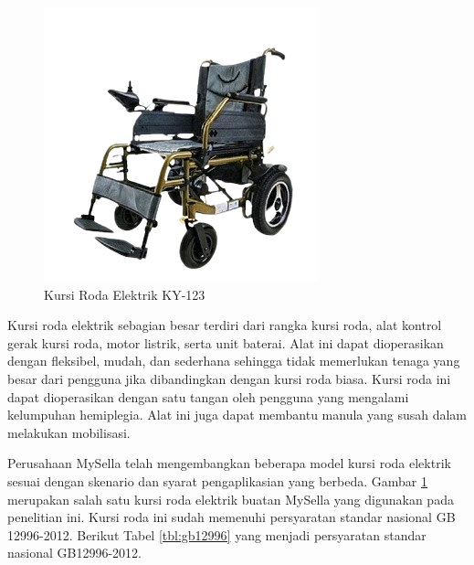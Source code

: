 \begin{figure} [ht]
    \centering
        \includegraphics[scale=0.72]{gambar/WheelchairMySellaKY123.png}
        \caption{Kursi Roda Elektrik KY-123}
        \label{fig:KY123}
\end{figure}

Kursi roda elektrik sebagian besar terdiri dari rangka kursi roda, alat kontrol gerak kursi roda, motor listrik, serta unit baterai. Alat ini dapat dioperasikan dengan fleksibel, mudah, dan sederhana sehingga tidak memerlukan tenaga yang besar dari pengguna jika dibandingkan dengan kursi roda biasa. Kursi roda ini dapat dioperasikan dengan satu tangan oleh pengguna yang mengalami kelumpuhan hemiplegia. Alat ini juga dapat membantu manula yang susah dalam melakukan mobilisasi. 

Perusahaan MySella telah mengembangkan beberapa model kursi roda elektrik sesuai dengan skenario dan syarat pengaplikasian yang berbeda. Gambar \ref{fig:KY123} merupakan salah satu kursi roda elektrik buatan MySella yang digunakan pada penelitian ini. Kursi roda ini sudah memenuhi persyaratan standar nasional GB 12996-2012. Berikut Tabel \ref{tbl:gb12996} yang menjadi persyaratan standar nasional GB12996-2012.

